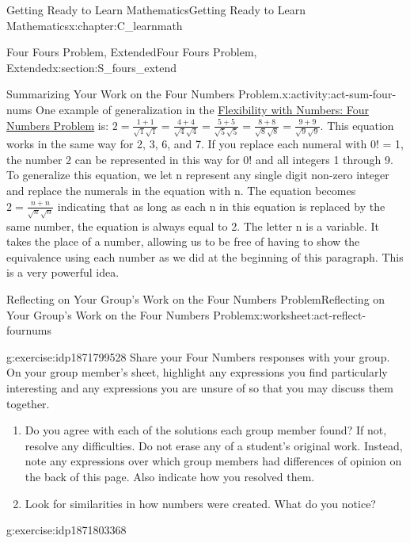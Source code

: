 \documentclass[oneside,10pt,]{book}
\numberwithin{equation}{chapter}
\begin{document}
\begin{chapterptx}{Getting Ready to Learn Mathematics}{}{Getting Ready to Learn Mathematics}{}{}{x:chapter:C_learnmath}
\begin{sectionptx}{Four Fours Problem, Extended}{}{Four Fours Problem, Extended}{}{}{x:section:S_fours_extend}
\begin{activity}{Summarizing Your Work on the Four Numbers Problem.}{x:activity:act-sum-four-nums}
One example of generalization in the \hyperref[x:worksheet:act-four-nums-prob]{Flexibility with Numbers: Four Numbers Problem} is: \(2=\frac{1+1}{\sqrt1\sqrt1}=\frac{4+4}{\sqrt4\sqrt4}=\frac{5+5}{\sqrt5\sqrt5}=\frac{8+8}{\sqrt8\sqrt8}=\frac{9+9}{\sqrt9\sqrt9}\). This equation works in the same way for 2, 3, 6, and 7. If you replace each numeral with 0! = 1, the number 2 can be represented in this way for 0! and all integers 1 through 9. To generalize this equation, we let n represent any single digit non-zero integer and replace the numerals in the equation with n. The equation becomes \(2=\frac{n+n}{\sqrt n\sqrt n}\) indicating that as long as each n in this equation is replaced by the same number, the equation is always equal to 2. The letter n is a variable. It takes the place of a number, allowing us to be free of having to show the equivalence using each number as we did at the beginning of this paragraph. This is a very powerful idea.%
\end{activity}%
%
%
\typeout{************************************************}
\typeout{************************************************}
%
\begin{worksheet-subsection}{Reflecting on Your Group's Work on the Four Numbers Problem}{}{Reflecting on Your Group's Work on the Four Numbers Problem}{}{}{x:worksheet:act-reflect-fournums}
\begin{divisionexercise}{1}{}{}{g:exercise:idp1871799528}%
Share your Four Numbers responses with your group. On your group member's sheet, highlight any expressions you find particularly interesting and any expressions you are unsure of so that you may discuss them together.%
\begin{enumerate}[font=\bfseries,label=(\alph*),ref=\alph*]
\item{}Do you agree with each of the solutions each group member found? If not, resolve any difficulties. Do not erase any of a student's original work. Instead, note any expressions over which group members had differences of opinion on the back of this page. Also indicate how you resolved them.%
\item{}Look for similarities in how numbers were created. What do you notice?%
\end{enumerate}
\end{divisionexercise}%
\begin{divisionexercise}{2}{}{}{g:exercise:idp1871803368}%

\end{divisionexercise}
\end{worksheet-subsection}
\end{sectionptx}
\end{chapterptx}
\end{document}
